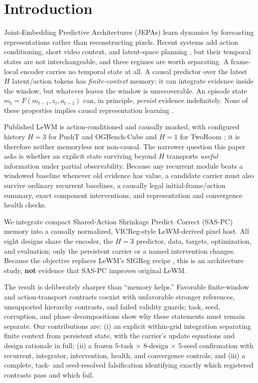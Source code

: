 \section{Introduction}\label{introduction}

Joint-Embedding Predictive Architectures (JEPAs) learn dynamics by
forecasting representations rather than reconstructing pixels. Recent
systems add action conditioning, short video context, and latent-space
planning \citep{ref1,ref2,ref3,ref4}, but their temporal states are not
interchangeable, and three regimes are worth separating. A frame-local
encoder carries no temporal state at all. A causal predictor over the
latest \(H\) latent/action tokens has \emph{finite-context}
memory: it can integrate evidence inside the window, but whatever leaves
the window is unrecoverable. An episode state \(m_t=F(m_{t-1},z_t,a_{t-1})\) can, in
principle, \emph{persist} evidence indefinitely. None of these
properties implies causal representation learning \citep{ref5}.

Published LeWM is action-conditioned and causally masked, with
configured history \(H=3\) for PushT and OGBench-Cube and
\(H=1\) for TwoRoom \citep{ref1}; it is therefore neither
memoryless nor non-causal. The narrower question this paper asks is
whether an explicit state surviving beyond \(H\) transports
\emph{useful} information under partial observability. Because any
recurrent module beats a windowed baseline whenever old evidence has
value, a candidate carrier must also survive ordinary recurrent
baselines, a causally legal initial-frame/action summary, exact
component interventions, and representation and convergence health
checks.

We integrate compact Shared-Action Shrinkage Predict--Correct (SAS-PC)
memory into a causally normalized, VICReg-style \citep{ref17}
LeWM-derived pixel host. All eight designs share the encoder, the
\(H=3\) predictor, data, targets, optimization, and evaluation;
only the persistent carrier or a named intervention changes. Because the
objective replaces LeWM's SIGReg recipe \citep{ref16}, this is an
architecture study, \textbf{not} evidence that SAS-PC improves original
LeWM.

The result is deliberately sharper than ``memory helps.'' Favorable
finite-window and action-transport contrasts coexist with unfavorable
stronger references, unsupported hierarchy contrasts, and failed
validity guards; task, seed, corruption, and phase decompositions show
why these statements must remain separate. Our contributions are: (i) an
explicit within-grid integration separating finite context from
persistent state, with the carrier's update equations and design
rationale in full; (ii) a frozen \(5\)-task \(\times\)
\(8\)-design \(\times\) \(5\)-seed confirmation with
recurrent, integrator, intervention, health, and convergence controls;
and (iii) a complete, task- and seed-resolved falsification identifying
exactly which registered contrasts pass and which fail.

